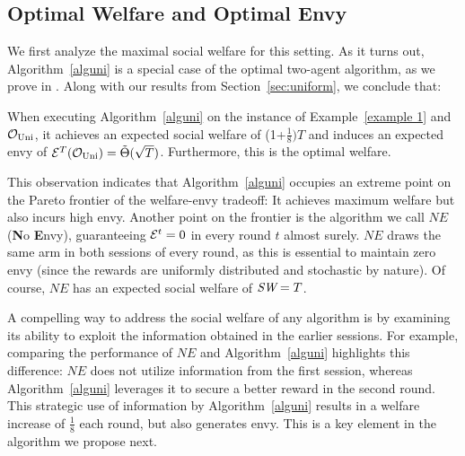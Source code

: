 \subsection{Optimal Welfare and Optimal Envy}\label{subsec:ext welfare}
We first analyze the maximal social welfare for this setting. As it turns out, Algorithm~\ref{alguni} is a special case of the optimal two-agent algorithm, as we prove in . Along with our results from Section~\ref{sec:uniform}, we conclude that:
\begin{observation}\label{obs:opt for tradeoff}
When executing Algorithm~\ref{alguni} on the instance of Example~\ref{example 1} and $\mathcal O_{\textnormal{Uni}}$, it achieves an expected social welfare of (1+$\frac{1}{8}) T$ and induces an expected envy of $\mathcal{E}^T(\mathcal O_{\textnormal{Uni}})=\tilde \Theta(\sqrt T)$. Furthermore, this is the optimal welfare.
\end{observation}
This observation indicates that Algorithm~\ref{alguni} occupies an extreme point on the Pareto frontier of the welfare-envy tradeoff: It achieves maximum welfare but also incurs high envy. Another point on the frontier is the algorithm we call $NE$ (\textbf{N}o \textbf{E}nvy), guaranteeing $\mathcal{E}^t=0$ in every round $t$ almost surely. $NE$ draws the same arm in both sessions of every round, as this is essential to maintain zero envy (since the rewards are uniformly distributed and stochastic by nature). Of course, $NE$ has an expected social welfare of $\textit{SW}= T$. 


A compelling way to address the social welfare of any algorithm is by examining its ability to exploit the information obtained in the earlier sessions. For example, comparing the performance of $NE$ and Algorithm~\ref{alguni} highlights this difference: $NE$ does not utilize information from the first session, whereas Algorithm~\ref{alguni} leverages it to secure a better reward in the second round. This strategic use of information by Algorithm~\ref{alguni} results in a welfare increase of $\frac{1}{8}$ each round, but also generates envy. This is a key element in the algorithm we propose next.

